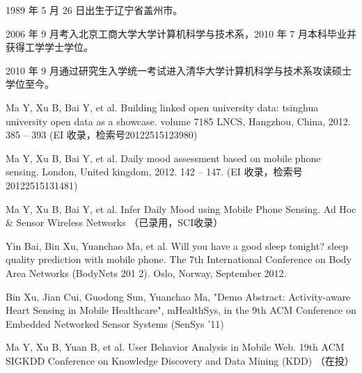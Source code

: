 \begin{resume}


  1989 年 5 月 26 日出生于辽宁省盖州市。
  
  2006 年 9 月考入北京工商大学大学计算机科学与技术系，2010 年 7 月本科毕业并获得工学学士学位。
  
  2010 年 9 月通过研究生入学统一考试进入清华大学计算机科学与技术系攻读硕士学位至今。


  \begin{enumerate}[{[}1{]}]
  \item Ma Y, Xu B, Bai Y, et al. Building linked open university data: tsinghua university open data
as a showcase. volume 7185 LNCS, Hangzhou, China, 2012. 385 – 393 (EI 收录，检索号20122515123980)

  \item Ma Y, Xu B, Bai Y, et al. Daily mood assessment based on mobile phone sensing. London,
United kingdom, 2012. 142 – 147. (EI 收录，检索号20122515131481)

  \item Ma Y, Xu B, Bai Y, et al. Infer Daily Mood using Mobile Phone Sensing. Ad Hoc \& Sensor Wireless Networks （已录用，SCI收录）

  \item Yin  Bai, Bin Xu, Yuanchao Ma,  et al.  Will you have a good sleep tonight? sleep quality prediction with mobile phone. The 7th International Conference on Body Area Networks (BodyNets 201 2). Oslo, Norway, September 2012.

  \item Bin  Xu,  Jian  Cui,  Guodong  Sun,  Yuanchao  Ma,  "Demo  Abstract:  Activity-aware  Heart  Sensing  in  Mobile
Healthcare", mHealthSys, in the 9th ACM Conference on Embedded Networked Sensor Systems (SenSys '11)

  \item Ma Y, Xu B, Yuan B, et al. User Behavior Analysis in Mobile Web. 19th ACM SIGKDD Conference on Knowledge Discovery and Data Mining (KDD) （在投）
  \end{enumerate}

\end{resume}
